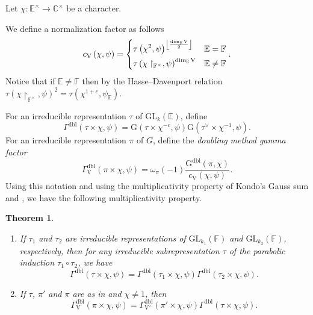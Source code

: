 \documentclass[12pt, reqno]{amsart}
\newtheorem{theorem}{Theorem}[section]
\theoremstyle{definition}
\theoremstyle{definition}
\theoremstyle{definition}
\newcommand{\cComplex}{\mathbb{C}}
\newcommand{\multiplicativegroup}[1]{#1^{\times}}
\newcommand{\hermitianSpace}{\mathrm{V}}
\newcommand{\fieldCharacter}{\psi}
\newcommand{\centralCharacter}[1]{\omega_{#1}}
\newcommand{\Contragradient}[1]{#1^{\vee}}
\newcommand{\minusInvolution}[1]{#1^{-c}}
\newcommand{\involutionPlusOne}[1]{#1^{1+c}}
\newcommand{\GL}{\mathrm{GL}}
\newcommand{\finiteField}{\mathbb{F}}
\newcommand{\quadraticExtension}{\mathbb{E}}
\newcommand{\GaussSumScalar}[2]{\mathrm{G}\left(#1, #2\right)}
\newcommand{\dblGaussSumScalar}[2]{\mathrm{G}^{\mathrm{dbl}}\left(#1, #2\right)}
\newcommand{\dblGammaFactor}[3]{\Gamma^{\mathrm{dbl}}\left(#1 \times #2, #3\right)}
\newcommand{\dblGammaFactorSpace}[4]{\Gamma^{\mathrm{dbl}}_{#1}\left(#2 \times #3, #4\right)}
\begin{document}
Let $\chi \colon \multiplicativegroup{\quadraticExtension} \to \multiplicativegroup{\cComplex}$ be a character.

We define a normalization factor as follows $$c_{\hermitianSpace}\left(\chi, \fieldCharacter\right) = \begin{dcases}
	\tau\left(\chi^2, \fieldCharacter\right)^{\left\lfloor\frac{\dim_{\finiteField} \hermitianSpace}{2}\right\rfloor} & \quadraticExtension = \finiteField\\
	\tau\left(\chi\restriction_{\multiplicativegroup{\finiteField}}, \fieldCharacter\right)^{\dim_{\quadraticExtension} \hermitianSpace} & \quadraticExtension \ne \finiteField
\end{dcases}.$$
Notice that if $\quadraticExtension \ne \finiteField$ then by the Hasse--Davenport relation $\tau\left(\chi\restriction_{\multiplicativegroup{\finiteField}}, \fieldCharacter\right)^{2} = \tau\left(\involutionPlusOne{\chi}, \fieldCharacter_{\quadraticExtension}\right)$.

For an irreducible representation  $\tau$ of $\GL_k\left(\quadraticExtension\right)$, define $$\dblGammaFactor{\tau}{\chi}{\fieldCharacter} = \GaussSumScalar{\tau \times \minusInvolution{\chi}}{\fieldCharacter} \GaussSumScalar{\Contragradient{\tau} \times \chi^{-1}}{\fieldCharacter}.$$
For an irreducible representation $\pi$ of $G$, define the \emph{doubling method gamma factor} $$\dblGammaFactorSpace{\hermitianSpace}{\pi}{\chi}{\fieldCharacter} = \centralCharacter{\pi}\left(-1\right) \frac{\dblGaussSumScalar{\pi}{\chi}}{c_{\hermitianSpace}\left(\chi, \fieldCharacter\right)}.$$
Using this notation and using the multiplicativity property of Kondo's Gauss sum and , we have the following multiplicativity property.

\begin{theorem}\label{thm:multiplicativity-in-terms-of-gamma-factors}
	\begin{enumerate}
		\item If $\tau_1$ and $\tau_2$ are irreducible representations of $\GL_{k_1}\left(\finiteField\right)$ and $\GL_{k_2}\left(\finiteField\right)$, respectively, then for any irreducible subrepresentation $\tau$ of the parabolic induction $\tau_1 \circ \tau_2$, we have
		$$\dblGammaFactor{\tau}{\chi}{\fieldCharacter} = \dblGammaFactor{\tau_1}{\chi}{\fieldCharacter} \dblGammaFactor{\tau_2}{\chi}{\fieldCharacter}.$$
		\item If $\tau$, $\pi'$ and $\pi$ are as in  and $\chi \ne 1$, then
		$$\dblGammaFactorSpace{\hermitianSpace}{\pi}{\chi}{\fieldCharacter} = \dblGammaFactorSpace{\hermitianSpace'}{\pi'}{\chi}{\fieldCharacter} \dblGammaFactor{\tau}{\chi}{\fieldCharacter}.$$
	\end{enumerate}
\end{theorem}
\end{document}
